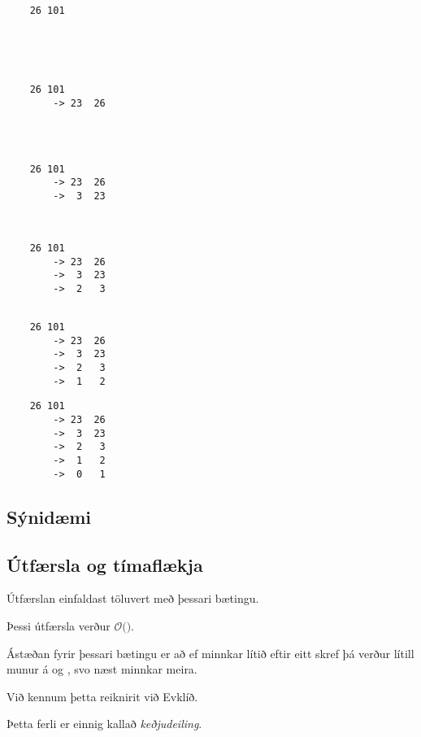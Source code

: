 { \begin{verbatim}
    26 101





        \end{verbatim}}
{ \begin{verbatim}
    26 101
        -> 23  26




        \end{verbatim}}
{ \begin{verbatim}
    26 101
        -> 23  26
        ->  3  23



        \end{verbatim}}
{ \begin{verbatim}
    26 101
        -> 23  26
        ->  3  23
        ->  2   3


        \end{verbatim}}
{ \begin{verbatim}
    26 101
        -> 23  26
        ->  3  23
        ->  2   3
        ->  1   2

        \end{verbatim}}
{ \begin{verbatim}
    26 101
        -> 23  26
        ->  3  23
        ->  2   3
        ->  1   2
        ->  0   1
        \end{verbatim}}

\subsection{Sýnidæmi}
{
}

\subsection{Útfærsla og tímaflækja}
{
    {
        \item<1-> Útfærslan einfaldast töluvert með þessari bætingu.
        \item<2->[] 
        \item<3-> Þessi útfærsla verður $\mathcal{O}($$)$.
        \item<5-> Ástæðan fyrir þessari bætingu er að ef  minnkar lítið eftir eitt skref
            þá verður lítill munur á  og , svo næst minnkar  meira.
        \item<6-> Við kennum þetta reiknirit við Evklíð.
        \item<7-> Þetta ferli er einnig kallað \emph{keðjudeiling}.
    }
}

